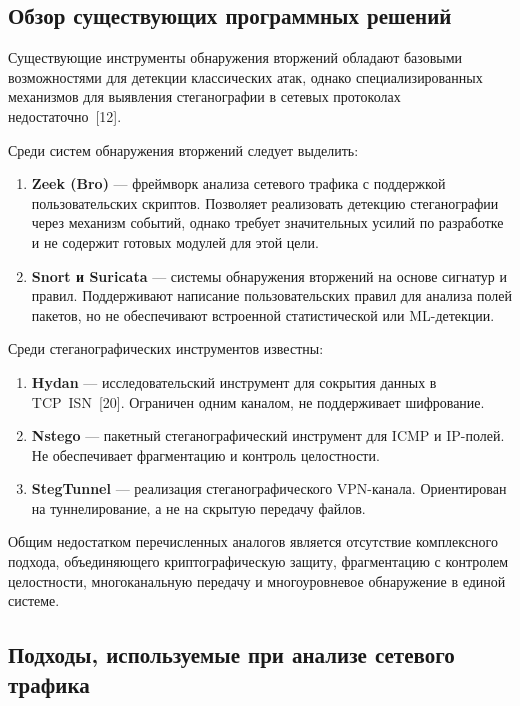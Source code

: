 \subsection{Обзор существующих программных решений}

Существующие инструменты обнаружения вторжений обладают базовыми возможностями для детекции классических атак, однако специализированных механизмов для выявления стеганографии в сетевых протоколах недостаточно~[12].

Среди систем обнаружения вторжений следует выделить:

\begin{enumerate}[label=\arabic*)]
  \item \textbf{Zeek (Bro)} --- фреймворк анализа сетевого трафика с поддержкой пользовательских скриптов. Позволяет реализовать детекцию стеганографии через механизм событий, однако требует значительных усилий по разработке и не содержит готовых модулей для этой цели.
  \item \textbf{Snort и Suricata} --- системы обнаружения вторжений на основе сигнатур и правил. Поддерживают написание пользовательских правил для анализа полей пакетов, но не обеспечивают встроенной статистической или ML-детекции.
\end{enumerate}

Среди стеганографических инструментов известны:

\begin{enumerate}[label=\arabic*)]
  \item \textbf{Hydan} --- исследовательский инструмент для сокрытия данных в TCP~ISN~[20]. Ограничен одним каналом, не поддерживает шифрование.
  \item \textbf{Nstego} --- пакетный стеганографический инструмент для ICMP и IP-полей. Не обеспечивает фрагментацию и контроль целостности.
  \item \textbf{StegTunnel} --- реализация стеганографического VPN-канала. Ориентирован на туннелирование, а не на скрытую передачу файлов.
\end{enumerate}

Общим недостатком перечисленных аналогов является отсутствие комплексного подхода, объединяющего криптографическую защиту, фрагментацию с контролем целостности, многоканальную передачу и многоуровневое обнаружение в единой системе.

\subsection{Подходы, используемые при анализе сетевого трафика}


